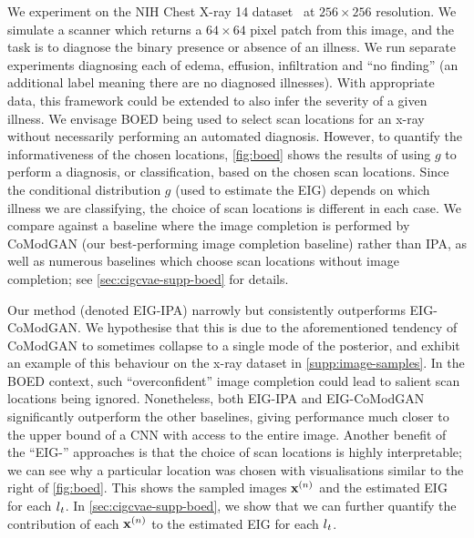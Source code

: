 We experiment on the NIH Chest X-ray 14 dataset~\citep{wang2017chestx} at
$256\times256$ resolution.
%
%
%
We simulate a scanner which returns a $64 \times 64$ pixel patch from this
image, and the task is to diagnose the binary presence or absence of an illness.
We run separate experiments diagnosing each of edema, effusion, infiltration and
``no finding'' (an additional label meaning there are no diagnosed illnesses).
With appropriate data, this framework could be extended to also infer the
severity of a given illness.
%
We envisage BOED being used to select scan locations for an x-ray without
necessarily performing an automated diagnosis. However, to quantify the
informativeness of the chosen locations, \cref{fig:boed} shows the results of
using $g$ to perform a diagnosis, or classification, based on the chosen scan
locations.
%
Since the conditional distribution $g$ (used to estimate the EIG) depends on
which illness we are classifying, the choice of scan locations is different in
each case.
%
We compare against a baseline where the image completion is performed by
CoModGAN (our best-performing image completion baseline) rather than IPA, as
well as numerous baselines which choose scan locations without image
completion; see \cref{sec:cigcvae-supp-boed} for details.

Our method (denoted EIG-IPA) narrowly but consistently outperforms EIG-CoModGAN.
%
%
We hypothesise that this is due to the aforementioned tendency of CoModGAN to
sometimes collapse to a single mode of the posterior, and exhibit an example of
this behaviour on the x-ray dataset in \cref{supp:image-samples}. In the BOED
context, such ``overconfident'' image completion could lead to salient scan
locations being ignored. Nonetheless, both EIG-IPA and EIG-CoModGAN
significantly outperform the other baselines, giving performance much closer to
the upper bound of a CNN with access to the entire image. Another benefit of the
``EIG-'' approaches is that the choice of scan locations is highly
interpretable; we can see why a particular location was chosen with
visualisations similar to the right of \cref{fig:boed}. This shows the sampled
images $\mathbf{x}{}^{(n)}$ and the estimated EIG for each $l{}_t$. In \cref{sec:cigcvae-supp-boed}, we
show that we can further quantify the contribution of each $\mathbf{x}{}^{(n)}$ to the
estimated EIG for each $l{}_t$.


